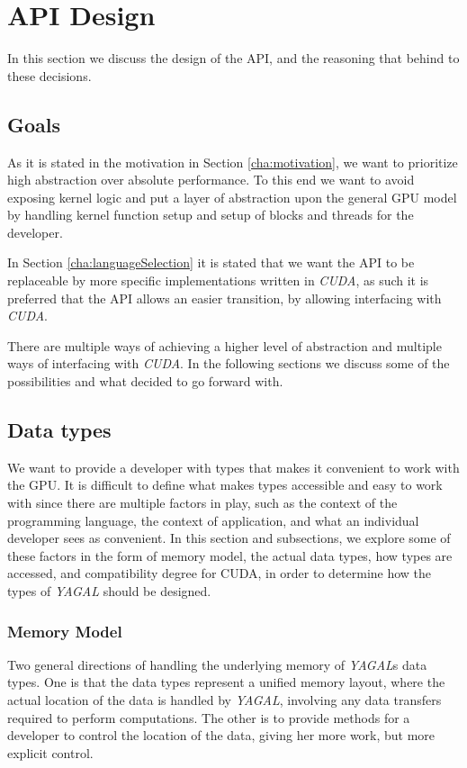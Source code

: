 \section{API Design}
In this section we discuss the design of the API, and the reasoning that behind to these decisions.

\subsection{Goals}
As it is stated in the motivation in Section \ref{cha:motivation}, we want to prioritize high abstraction over absolute performance. To this end we want to avoid exposing kernel logic and put a layer of abstraction upon the general GPU model by handling kernel function setup and setup of blocks and threads for the developer.

In Section \ref{cha:languageSelection} it is stated that we want the API to be replaceable by more specific implementations written in \textit{CUDA}, as such it is preferred that the API allows an easier transition, by allowing interfacing with \textit{CUDA}.

There are multiple ways of achieving a higher level of abstraction and multiple ways of interfacing with \textit{CUDA}. In the following sections we discuss some of the possibilities and what decided to go forward with.

\subsection{Data types}


We want to provide a developer with types that makes it convenient to work with the GPU. It is difficult to define what makes types accessible and easy to work with since there are multiple factors in play, such as the context of the programming language, the context of application, and what an individual developer sees as convenient. In this section and subsections, we explore some of these factors in the form of memory model, the actual data types, how types are accessed, and compatibility degree for CUDA, in order to determine how the types of \textit{YAGAL} should be designed.

\subsubsection{Memory Model} \label{memoryModelDesign}
Two general directions of handling the underlying memory of \textit{YAGAL}s data types. One is that the data types represent a unified memory layout, where the actual location of the data is handled by \textit{YAGAL}, involving any data transfers required to perform computations. The other is to provide methods for a developer to control the location of the data, giving her more work, but more explicit control. 


